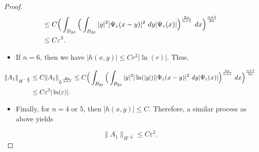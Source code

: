 \documentclass[10pt,a4paper]{amsart}
\begin{document}
\begin{proof}
\begin{align}
&\leq C\Big(\int_{B_{2\delta}}\Big(\int_{B_{2\delta}}|y|^{2}|\Psi_{\varepsilon}(x-y)|^{2}\ dy |\Psi_{\varepsilon}(x)|\Big)^{\frac{2n}{n+1}}\ dx\Big)^{\frac{n+1}{2n}} \notag\\
&\leq  C \varepsilon^{3}.\notag
\end{align}
\begin{itemize}
\item If $n=6$, then we have $|h(x,y)|\leq Cr^{2}|\ln(r)|$. Thus,
\end{itemize}
\begin{align}
\|A_{1}\|_{H^{-\frac{1}{2}}}&\leq C\|A_{1}\|_{L^{\frac{2n}{n+1}}}\leq C\Big(\int_{B_{2\delta}}\Big(\int_{B_{2\delta}}|y|^{2}|\ln(|y|)||\Psi_{\varepsilon}(x-y)|^{2}\ dy |\Psi_{\varepsilon}(x)|\Big)^{\frac{2n}{n+1}}\ dx\Big)^{\frac{n+1}{2n}} \notag\\
&\leq  C \varepsilon^{3}|\ln(\varepsilon)|.\notag
\end{align}

\begin{itemize}
\item Finally, for $n=4$ or $5$, then $|h(x,y)|\leq C$. Therefore, a similar process as above yields 
\end{itemize}
$$\|A_{1}\|_{H^{-\frac{1}{2}}}\leq C \varepsilon^{2}.$$




\end{proof}
\end{document}
